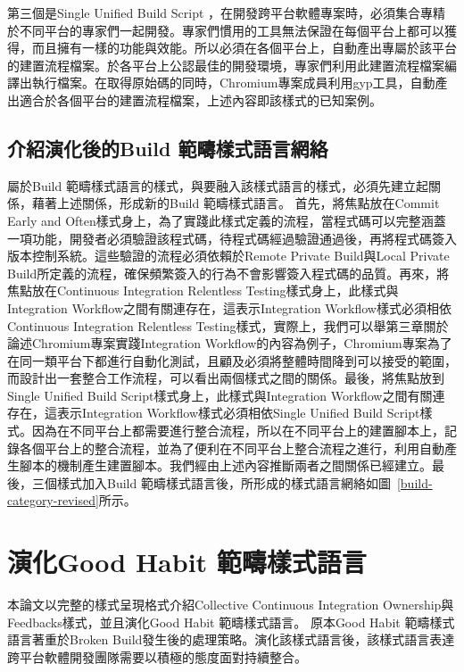 第三個是Single Unified Build Script ，在開發跨平台軟體專案時，必須集合專精於不同平台的專家們一起開發。專家們慣用的工具無法保證在每個平台上都可以獲得，而且擁有一樣的功能與效能。所以必須在各個平台上，自動產出專屬於該平台的建置流程檔案。於各平台上公認最佳的開發環境，專家們利用此建置流程檔案編譯出執行檔案。在取得原始碼的同時，Chromium專案成員利用gyp工具\cite{gyp}，自動產出適合於各個平台的建置流程檔案，上述內容即該樣式的已知案例。

\subsection{介紹演化後的Build 範疇樣式語言網絡}
屬於Build 範疇樣式語言的樣式，與要融入該樣式語言的樣式，必須先建立起關係，藉著上述關係，形成新的Build 範疇樣式語言。
首先，將焦點放在Commit Early and Often樣式身上，為了實踐此樣式定義的流程，當程式碼可以完整涵蓋一項功能\cite{scmpatterntasklevelcommit}，開發者必須驗證該程式碼，待程式碼經過驗證通過後，再將程式碼簽入版本控制系統。這些驗證的流程必須依賴於Remote Private Build與Local Private Build所定義的流程，確保頻繁簽入的行為不會影響簽入程式碼的品質。再來，將焦點放在Continuous Integration Relentless Testing樣式身上，此樣式與Integration Workflow之間有關連存在，這表示Integration Workflow樣式必須相依Continuous Integration Relentless Testing樣式，實際上，我們可以舉第三章關於論述Chromium專案實踐Integration Workflow的內容為例子，Chromium專案為了在同一類平台下都進行自動化測試，且顧及必須將整體時間降到可以接受的範圍，而設計出一套整合工作流程，可以看出兩個樣式之間的關係。最後，將焦點放到Single Unified Build Script樣式身上，此樣式與Integration Workflow之間有關連存在，這表示Integration Workflow樣式必須相依Single Unified Build Script樣式。因為在不同平台上都需要進行整合流程，所以在不同平台上的建置腳本上，記錄各個平台上的整合流程，並為了便利在不同平台上整合流程之進行，利用自動產生腳本的機制產生建置腳本。我們經由上述內容推斷兩者之間關係已經建立。最後，三個樣式加入Build 範疇樣式語言後，所形成的樣式語言網絡如圖~\ref{build-category-revised}所示。

\section{演化Good Habit 範疇樣式語言}
本論文以完整的樣式呈現格式介紹Collective Continuous Integration Ownership與Feedbacks樣式，並且演化Good Habit 範疇樣式語言。 
原本Good Habit 範疇樣式語言著重於Broken Build發生後的處理策略。演化該樣式語言後，該樣式語言表達跨平台軟體開發團隊需要以積極的態度面對持續整合。

